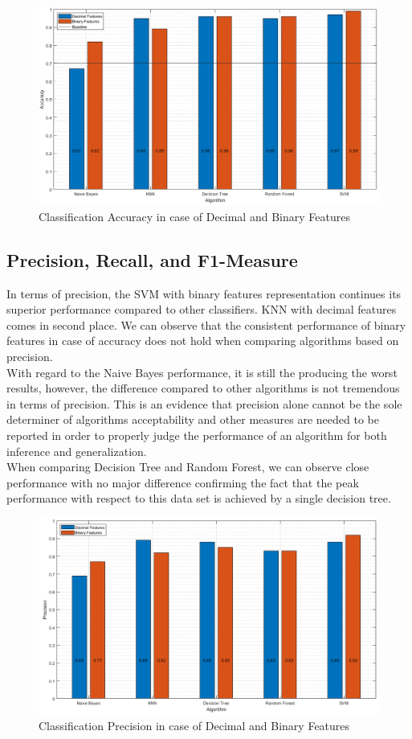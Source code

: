 \documentclass{article}
\begin{document}
\begin{figure}[H]
\centering
\includegraphics[width=\textwidth]{../Figures/accuracy.png}
\caption{Classification Accuracy in case of Decimal and Binary Features}
\end{figure}

\subsection{Precision, Recall, and F1-Measure}
In terms of precision, the SVM with binary features representation continues its superior performance compared to other classifiers. KNN with decimal features comes in second place. We can observe that the consistent performance of binary features in case of accuracy does not hold when comparing algorithms based on precision. \\
\indent With regard to the Naive Bayes performance, it is still the producing the worst results, however, the difference compared to other algorithms is not tremendous in terms of precision. This is an evidence that precision alone cannot be the sole determiner of algorithms acceptability and other measures are needed to be reported in order to properly judge the performance of an algorithm for both inference and generalization. \\
\indent When comparing Decision Tree and Random Forest, we can observe close performance with no major difference confirming the fact that the peak performance with respect to this data set is achieved by a single decision tree. 
\begin{figure}[H]
\centering
\includegraphics[width=\textwidth]{../Figures/precision.png}
\caption{Classification Precision in case of Decimal and Binary Features}
\end{figure}
\end{document}
